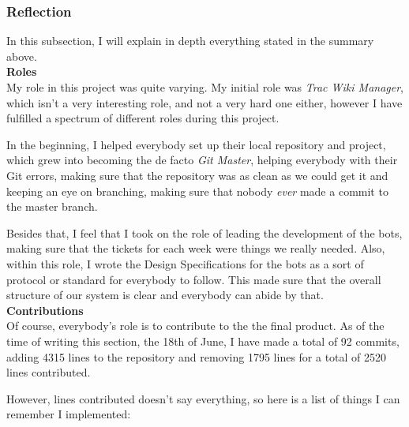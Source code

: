 \subsubsection{Reflection}
In this subsection, I will explain in depth everything stated in the summary above.
\\[2mm]\noindent
\textbf{Roles}\\
My role in this project was quite varying. My initial role was \emph{Trac
 Wiki Manager}, which isn't a very interesting role, and not a very hard one either, however I have fulfilled a spectrum of different roles during this project.
 
In the beginning, I helped everybody set up their local repository and project, which grew into becoming the de facto \emph{Git Master}, helping everybody with their Git errors, making sure that the repository was as clean as we could get it and keeping an eye on branching, making sure that nobody \emph{ever} made a commit to the master branch.

Besides that, I feel that I took on the role of leading the development of the bots, making sure that the tickets for each week were things we really needed. Also, within this role, I wrote the Design Specifications for the bots as a sort of protocol or standard for everybody to follow. This made sure that the overall structure of our system is clear and everybody can abide by that.
\\[2mm]\noindent
\textbf{Contributions}\\
Of course, everybody's role is to contribute to the the final product. As of the time of writing this section, the 18th of June, I have made a total of 92 commits, adding 4315 lines to the repository and removing 1795 lines for a total of 2520 lines contributed.

However, lines contributed doesn't say everything, so here is a list of things I can remember I implemented:

